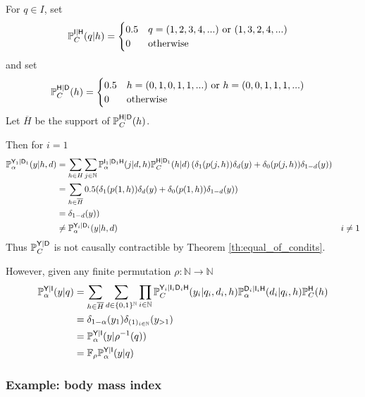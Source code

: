 \begin{example}
For $q\in I$, set
\begin{align}
    \mathbb{P}_C^{\mathsf{I}|\mathsf{H}}(q|h)&= \begin{cases}
        0.5 & q=(1,2,3,4,...) \text{ or } (1,3,2,4,...)\\
        0&\text{otherwise}
    \end{cases}
\end{align}
and set
\begin{align}
    \mathbb{P}_C^{\mathsf{H}|\mathsf{D}}(h) &= \begin{cases}
        0.5 & h=(0,1,0,1,1,...)\text{ or }h=(0,0,1,1,1,...)\\
        0 &\text{otherwise}
    \end{cases}
\end{align}
Let $\overline{H}$ be the support of $\mathbb{P}_C^{\mathsf{H}|\mathsf{D}}(h)$.

Then for $i=1$
\begin{align}
    \mathbb{P}_\alpha^{\mathsf{Y}_1|\mathsf{D}_1}(y|h,d) &= \sum_{h\in H} \sum_{j\in \mathbb{N}} \mathbb{P}_\alpha^{\mathsf{I}_1|\mathsf{D}_1\mathsf{H}}(j|d,h)\mathbb{P}_C^{\mathsf{H}|\mathsf{D}_1}(h|d)\left(\delta_1(p(j,h))\delta_d(y) + \delta_0(p(j,h))\delta_{1-d}(y)\right)\\
    &= \sum_{h\in \overline{H}} 0.5( \delta_1(p(1,h))\delta_d(y) + \delta_0(p(1,h))\delta_{1-d}(y))\\
    &= \delta_{1-d}(y))\\
    &\neq  \mathbb{P}_\alpha^{\mathsf{Y}_i|\mathsf{D}_i}(y|h,d) & i\neq 1
\end{align}
Thus $\mathbb{P}_C^{\mathsf{Y}|\mathsf{D}}$ is not causally contractible by Theorem \ref{th:equal_of_condits}. 

However, given any finite permutation $\rho:\mathbb{N}\to\mathbb{N}$
\begin{align}
    \mathbb{P}_\alpha^{\mathsf{Y}|\mathsf{I}}(y|q) &= \sum_{h\in \overline{H}}\sum_{d\in\{0,1\}^{\mathbb{N}}} \prod_{i\in \mathbb{N}} \mathbb{P}_C^{\mathsf{Y}_i|\mathsf{I}_i\mathsf{D}_i\mathsf{H}}(y_i|q_i,d_i,h) \mathbb{P}_\alpha^{\mathsf{D}_i|\mathsf{I}_i\mathsf{H}}(d_i|q_i,h)\mathbb{P}_C^{\mathsf{H}}(h)\\
    &= \delta_{1-\alpha}(y_1)\delta_{(1)_{i\in\mathbb{N}}}(y_{>1})\\
    &= \mathbb{P}_\alpha^{\mathsf{Y}|\mathsf{I}}(y|\rho^{-1}(q))\\
    &= \mathbb{F}_{\rho}\mathbb{P}_\alpha^{\mathsf{Y}|\mathsf{I}}(y|q)
\end{align}
\end{example}

\subsubsection{Example: body mass index}


